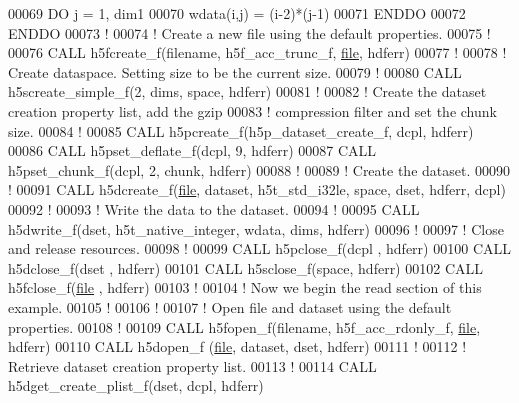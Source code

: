 \begin{DoxyCode}
00069      \textcolor{keywordflow}{DO} j = 1, dim1
00070         wdata(i,j) = (i-2)*(j-1)
00071 \textcolor{keywordflow}{     ENDDO}
00072 \textcolor{keywordflow}{  ENDDO}
00073   \textcolor{comment}{!}
00074   \textcolor{comment}{! Create a new file using the default properties.}
00075   \textcolor{comment}{!}
00076   \textcolor{keyword}{CALL }h5fcreate\_f(filename, h5f\_acc\_trunc\_f, \hyperlink{structfile}{file}, hdferr)
00077   \textcolor{comment}{!}
00078   \textcolor{comment}{! Create dataspace.  Setting size to be the current size.}
00079   \textcolor{comment}{!}
00080   \textcolor{keyword}{CALL }h5screate\_simple\_f(2, dims, space, hdferr)
00081   \textcolor{comment}{!}
00082   \textcolor{comment}{! Create the dataset creation property list, add the gzip}
00083   \textcolor{comment}{! compression filter and set the chunk size.}
00084   \textcolor{comment}{!}
00085   \textcolor{keyword}{CALL }h5pcreate\_f(h5p\_dataset\_create\_f, dcpl, hdferr)
00086   \textcolor{keyword}{CALL }h5pset\_deflate\_f(dcpl, 9, hdferr)
00087   \textcolor{keyword}{CALL }h5pset\_chunk\_f(dcpl, 2, chunk, hdferr)
00088   \textcolor{comment}{!}
00089   \textcolor{comment}{! Create the dataset.}
00090   \textcolor{comment}{!}
00091   \textcolor{keyword}{CALL }h5dcreate\_f(\hyperlink{structfile}{file}, dataset, h5t\_std\_i32le, space, dset, hdferr, dcpl)
00092   \textcolor{comment}{!}
00093   \textcolor{comment}{! Write the data to the dataset.}
00094   \textcolor{comment}{!}
00095   \textcolor{keyword}{CALL }h5dwrite\_f(dset, h5t\_native\_integer, wdata, dims, hdferr)
00096   \textcolor{comment}{!}
00097   \textcolor{comment}{! Close and release resources.}
00098   \textcolor{comment}{!}
00099   \textcolor{keyword}{CALL }h5pclose\_f(dcpl , hdferr)
00100   \textcolor{keyword}{CALL }h5dclose\_f(dset , hdferr)
00101   \textcolor{keyword}{CALL }h5sclose\_f(space, hdferr)
00102   \textcolor{keyword}{CALL }h5fclose\_f(\hyperlink{structfile}{file} , hdferr)
00103   \textcolor{comment}{!}
00104   \textcolor{comment}{! Now we begin the read section of this example.}
00105   \textcolor{comment}{!}
00106   \textcolor{comment}{!}
00107   \textcolor{comment}{! Open file and dataset using the default properties.}
00108   \textcolor{comment}{!}
00109   \textcolor{keyword}{CALL }h5fopen\_f(filename, h5f\_acc\_rdonly\_f, \hyperlink{structfile}{file}, hdferr)
00110   \textcolor{keyword}{CALL }h5dopen\_f (\hyperlink{structfile}{file}, dataset, dset, hdferr)
00111   \textcolor{comment}{!}
00112   \textcolor{comment}{! Retrieve dataset creation property list.}
00113   \textcolor{comment}{!}
00114   \textcolor{keyword}{CALL }h5dget\_create\_plist\_f(dset, dcpl, hdferr)

\end{DoxyCode}
